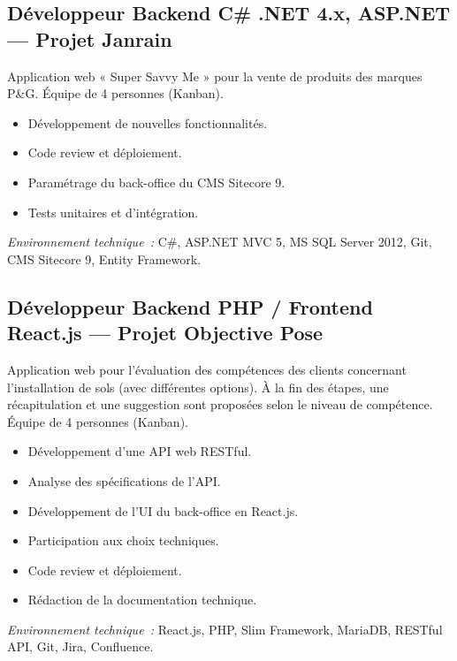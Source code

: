 \documentclass[10pt,a4paper]{article}
\begin{document}
\vspace{6pt}

\subsection*{Développeur Backend C\# .NET 4.x, ASP.NET --- Projet Janrain}
\color{darkgray}
Application web « Super Savvy Me » pour la vente de produits des marques P\&G. Équipe de 4 personnes (Kanban).
\begin{itemize}
  \item Développement de nouvelles fonctionnalités.
  \item Code review et déploiement.
  \item Paramétrage du back-office du CMS Sitecore 9.
  \item Tests unitaires et d'intégration.
\end{itemize}
\textit{Environnement technique~:} C\#, ASP.NET MVC 5, MS SQL Server 2012, Git, CMS Sitecore 9, Entity Framework.

\vspace{6pt}

\subsection*{Développeur Backend PHP / Frontend React.js --- Projet Objective Pose}
\color{darkgray}
Application web pour l'évaluation des compétences des clients concernant l'installation de sols (avec différentes options). À la fin des étapes, une récapitulation et une suggestion sont proposées selon le niveau de compétence. Équipe de 4 personnes (Kanban).
\begin{itemize}
  \item Développement d'une API web RESTful.
  \item Analyse des spécifications de l'API.
  \item Développement de l'UI du back-office en React.js.
  \item Participation aux choix techniques.
  \item Code review et déploiement.
  \item Rédaction de la documentation technique.
\end{itemize}
\textit{Environnement technique~:} React.js, PHP, Slim Framework, MariaDB, RESTful API, Git, Jira, Confluence.

\vspace{6pt}
\end{document}
